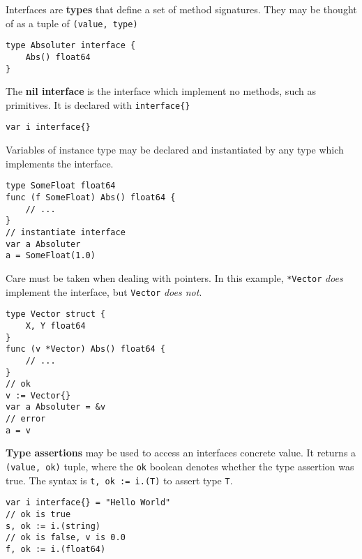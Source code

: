 \documentclass{article}
\begin{document}
\begin{paracol}{2}

\noindent Interfaces are \textbf{types} that define a set of method signatures. They may be thought of as a tuple of \lstinline|(value, type)|

\switchcolumn
\begin{lstlisting}
type Absoluter interface {
    Abs() float64
}
\end{lstlisting}
\switchcolumn*

\noindent The \textbf{nil interface} is the interface which implement no methods, such as primitives. It is declared with \lstinline|interface{}|
\\
\switchcolumn

\begin{lstlisting}
var i interface{}
\end{lstlisting}

\switchcolumn*

\noindent Variables of instance type may be declared and instantiated by any type which implements the interface.

\switchcolumn
\begin{lstlisting}
type SomeFloat float64
func (f SomeFloat) Abs() float64 {
    // ...
}
// instantiate interface
var a Absoluter
a = SomeFloat(1.0)
\end{lstlisting}

\switchcolumn*

\noindent Care must be taken when dealing with pointers. In this example, \lstinline|*Vector| \textit{does} implement the interface, but \lstinline|Vector| \textit{does not}.

\switchcolumn

\begin{lstlisting}
type Vector struct {
    X, Y float64
}
func (v *Vector) Abs() float64 {
    // ...
}
// ok
v := Vector{}
var a Absoluter = &v
// error
a = v 
\end{lstlisting}
\switchcolumn*

\noindent \textbf{Type assertions} may be used to access an interfaces concrete value. It returns a \lstinline|(value, ok)| tuple, where the \lstinline|ok| boolean denotes whether the type assertion was true. The syntax is \lstinline|t, ok := i.(T)| to assert type \lstinline|T|.

\switchcolumn
\begin{lstlisting}
var i interface{} = "Hello World"
// ok is true
s, ok := i.(string) 
// ok is false, v is 0.0
f, ok := i.(float64)
\end{lstlisting}
\switchcolumn*


\end{paracol}
\end{document}
